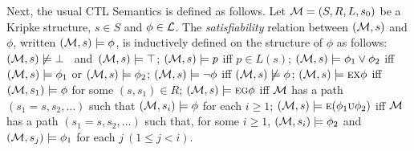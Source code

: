 \documentclass[letterpaper]{article} %
\begin{document}

Next, the usual CTL Semantics is defined as follows.
Let ${\cal M}=(S,R,L,s_0)$ be a Kripke structure, $s\in S$ and $\phi \in \cal L$.
The {\em satisfiability} relation between $({\cal M},s)$ and $\phi$,
written $({\cal M},s)\models\phi$, is inductively defined on the structure of $\phi$ as follows:
  $({\cal M},s)\not\models\bot$ \ and\  $({\cal M},s)\models\top$;
 $({\cal M},s)\models p$ iff $p\in L(s)$;
  $({\cal M},s)\models \phi_1\lor\phi_2$ iff
    $({\cal M},s)\models \phi_1$ or $({\cal M},s)\models \phi_2$;
 $({\cal M},s)\models \neg\phi$ iff  $({\cal M},s)\not\models\phi$;
   $({\cal M},s)\models \textsc{e}\textsc{x}\phi$ iff
    $({\cal M},s_1)\models\phi$ for some $(s,s_1)\in R$;
  $({\cal M},s)\models \textsc{e}\textsc{g}\phi$ iff
    $\cal M$ has a path $(s_1=s,s_2,\ldots)$ such that
    $({\cal M},s_i)\models\phi$ for each $i\ge 1$;
 $({\cal M},s)\models \textsc{e}(\phi_1\textsc{u}\phi_2)$ iff
    $\cal M$ has a path $(s_1=s,s_2,\ldots)$ such that, for some $i\ge 1$,
    $({\cal M},s_i)\models\phi_2$ and
    $({\cal M},s_j)\models\phi_1$ for each $j~(1\leq j<i)$.
\end{document}

